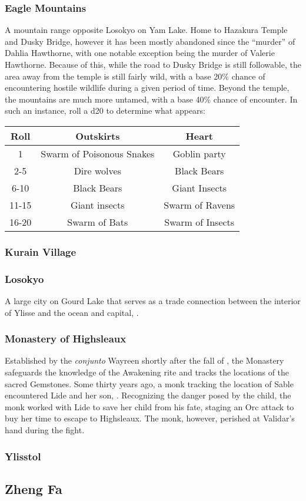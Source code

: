 \subsubsection{Eagle Mountains}
\label{places:eaglemountains}
A mountain range opposite Losokyo on Yam Lake. Home to Hazakura Temple and Dusky Bridge, however it has been mostly abandoned since the ``murder'' of Dahlia Hawthorne, with one notable exception being the murder of Valerie Hawthorne. Because of this, while the road to Dusky Bridge is still followable, the area away from the temple is still fairly wild, with a base 20\% chance of encountering hostile wildlife during a given period of time. Beyond the temple, the mountains are much more untamed, with a base 40\% chance of encounter.  In such an instance, roll a d20 to determine what appears:\\
\begin{center}
\begin{tabular}{c c c}
Roll & Outskirts & Heart \\\hline
1 & Swarm of Poisonous Snakes  & Goblin party \\
2-5 & Dire wolves & Black Bears \\
6-10 & Black Bears & Giant Insects \\
11-15 & Giant insects & Swarm of Ravens \\
16-20 & Swarm of Bats  & Swarm of Insects \end{tabular}\end{center}

\subsubsection{Kurain Village}
\label{places:kurain}

\subsubsection{Losokyo}
\label{places:losokyo}
A large city on Gourd Lake that serves as a trade connection between the interior of Ylisse and the ocean and capital, . 

\subsubsection{Monastery of Highsleaux}
\label{places:highsleaux}
Established by the \textit{conjunto} Wayreen shortly after the fall of , the Monastery safeguards the knowledge of the Awakening rite and tracks the locations of the sacred Gemstones. Some thirty years ago, a monk tracking the location of Sable encountered Lide and her son, . Recognizing the danger posed by the child, the monk worked with Lide to save her child from his fate, staging an Orc attack to buy her time to escape to Highsleaux. The monk, however, perished at Validar's hand during the fight.

\subsubsection{Ylisstol}
\label{places:ylisstol}

\subsection{Zheng Fa}
\label{nations:zhengfa}